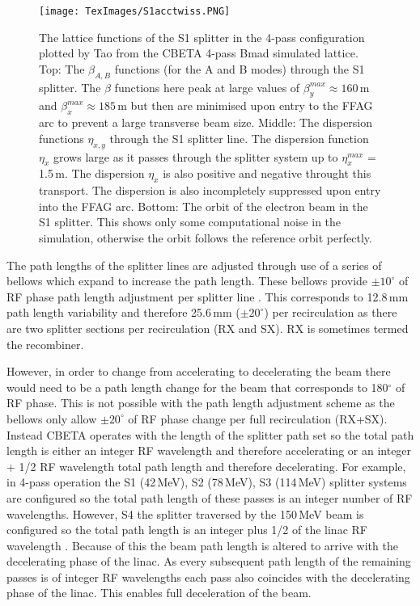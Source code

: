 \documentclass[11pt]{article}
\begin{document}
\begin{figure}[H]
\centering 
\texttt{[image: TexImages/S1acctwiss.PNG]}
\caption{\label{fig:S1twiss} The lattice functions of the S1 splitter in the 4-pass configuration plotted by Tao from the CBETA 4-pass Bmad simulated lattice. Top: The $\beta_{A,B}$ functions (for the A and B modes) through the S1 splitter. The $\beta$ functions here peak at large values of $\beta^{max}_{y} \approx 160$\,m and $\beta^{max}_{x} \approx 185$\,m but then are minimised upon entry to the FFAG arc to prevent a large transverse beam size. Middle: The dispersion functions $\eta_{x,y}$ through the S1 splitter line. The dispersion function $\eta_{x}$ grows large as it passes through the splitter system up to $\eta^{max}_{x}$ = 1.5\,m. The dispersion $\eta_{x}$ is also positive and negative throught this transport. The dispersion is also incompletely suppressed upon entry into the FFAG arc. Bottom: The orbit of the electron beam in the S1 splitter. This shows only some computational noise in the simulation, otherwise the orbit follows the reference orbit perfectly.}
\end{figure}

The path lengths of the splitter lines are adjusted through use of a series of bellows which expand to increase the path length. These bellows provide $\pm 10^{\circ}$ of RF phase path length adjustment per splitter line \cite{CBETATDR}. This corresponds to 12.8\,mm path length variability and therefore 25.6\,mm ($\pm 20^{\circ}$) per recirculation as there are two splitter sections per recirculation (RX and SX). RX is sometimes termed the recombiner. 

\vspace{5mm}

However, in order to change from accelerating to decelerating the beam there would need to be a path length change for the beam that corresponds to 180$^{\circ}$ of RF phase. This is not possible with the path length adjustment scheme as the bellows only allow $\pm 20^{\circ}$ of RF phase change per full recirculation (RX+SX). Instead CBETA operates with the length of the splitter path set so the total path length is either an integer RF wavelength and therefore accelerating or an integer + 1/2 RF wavelength total path length and therefore decelerating. For example, in 4-pass operation the S1 (42\,MeV), S2 (78\,MeV), S3 (114\,MeV) splitter systems are configured so the total path length of these passes is an integer number of RF wavelengths. However, S4 the splitter traversed by the 150\,MeV beam is configured so the total path length is an integer plus 1/2 of the linac RF wavelength \cite{CBETATDR}. Because of this the beam path length is altered to arrive with the decelerating phase of the linac. As every subsequent path length of the remaining passes is of integer RF wavelengths each pass also coincides with the decelerating phase of the linac. This enables full deceleration of the beam.
\end{document}
